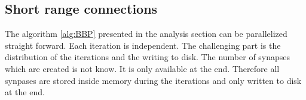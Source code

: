 

\subsection{Short range connections}

The algorithm \ref{alg:BBP} presented in the analysis section can be parallelized straight forward.
Each iteration is independent. The challenging part is the distribution of the iterations and
the writing to disk. The number of synapses which are created is not know. It is only available
at the end. Therefore all synpases are stored inside memory during the iterations and only written to disk 
at the end.

